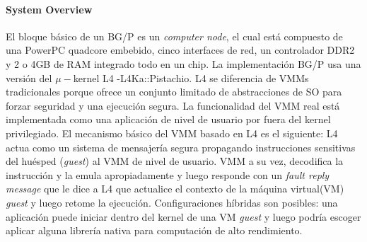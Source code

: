 \paragraph{\textnormal{\textbf{System Overview}}}
El bloque básico de un BG/P es un \emph{computer node}, el cual está compuesto de una PowerPC quadcore embebido, cinco interfaces de red, un controlador DDR2 y 2 o 4GB de RAM integrado todo en un chip. La implementación BG/P usa una versión del $\mu-$kernel L4 -L4Ka::Pistachio. L4 se diferencia de VMMs tradicionales porque ofrece un conjunto limitado de abstracciones de SO para forzar seguridad y una ejecución segura. La funcionalidad del VMM real está implementada como una aplicación de nivel de usuario por fuera del kernel privilegiado. El mecanismo básico del VMM basado en L4 es el siguiente: L4 actua como un sistema de mensajería segura propagando instrucciones sensitivas del huésped (\emph{guest}) al VMM de nivel de usuario. VMM a su vez, decodifica la instrucción y la emula apropiadamente y luego responde con un \emph{fault reply message} que le dice a L4 que actualice el contexto de la máquina virtual(VM) \emph{guest} y luego retome la ejecución. Configuraciones híbridas son posibles: una aplicación puede iniciar dentro del kernel de una VM \emph{guest} y luego podría escoger aplicar alguna librería nativa para computación de alto rendimiento.

